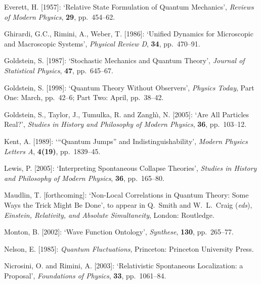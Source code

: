 \documentclass[12pt]{article}
\begin{document}
\begin{thebibliography}{29}
 Everett, H. [1957]:  `Relative State Formulation of Quantum Mechanics',
\textit{Reviews of Modern Physics}, \textbf{29}, pp.~454--62.

 Ghirardi, G.C., Rimini, A., Weber, T. [1986]: `Unified
  Dynamics for Microscopic and Macroscopic Systems', \textit{Physical Review
    D}, \textbf{34}, pp.~470--91.

 Goldstein, S. [1987]: `Stochastic Mechanics and Quantum
  Theory', \textit{Journal of Statistical Physics}, \textbf{47}, pp.~645--67.
  
 Goldstein, S. [1998]: `Quantum Theory Without Observers',
  \textit{Physics Today}, Part One: March, pp.~42--6; 
  Part Two: April, pp.~38--42.
 
  Goldstein, S., Taylor, J., Tumulka, R. and Zangh\`\i, N. [2005]: 
  `Are All Particles Real?',
  \textit{Studies in History and Philosophy of Modern Physics},
  \textbf{36}, pp.~103--12.  %

 Kent, A. [1989]: `{}``Quantum Jumps'' and Indistinguishability',
  \textit{Modern Physics Letters A}, \textbf{4(19)}, pp.~1839--45.

 Lewis, P. [2005]: `Interpreting Spontaneous Collapse Theories', {\it Studies in History and Philosophy of Modern Physics}, \textbf{36}, pp.~165--80.

 Maudlin, T. [forthcoming]: `Non-Local Correlations in Quantum Theory: Some Ways the Trick Might Be Done', to appear in Q.~Smith and   W.~L.~Craig (\textit{eds}),
  \textit{Einstein, Relativity, and Absolute Simultaneity},
  London: Routledge.

 Monton, B. [2002]: `Wave Function Ontology',
	\textit{Synthese}, \textbf{130}, pp.~265--77.
	
 Nelson, E. [1985]: \textit{Quantum Fluctuations},
  Princeton: Princeton University Press.

 Nicrosini, O. and Rimini, A. [2003]:
  `Relativistic Spontaneous Localization: a Proposal', 
  {\it Foundations of Physics}, {\bf 33}, pp.~1061--84. 


\end{thebibliography}
\end{document}
